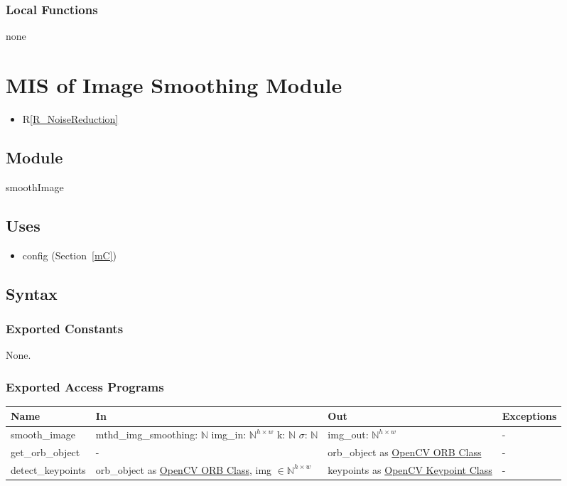 \documentclass[12pt, titlepage]{article}
\begin{document}
\subsubsection{Local Functions}
none


\section{MIS of Image Smoothing Module} \label{mIS}
\begin{itemize}
  \item R\ref{R_NoiseReduction}
\end{itemize}
\subsection{Module}
smoothImage

\subsection{Uses}
\begin{itemize}
  \item config (Section~\ref{mC})
\end{itemize}

\subsection{Syntax}
\subsubsection{Exported Constants}
None.
\subsubsection{Exported Access Programs}
\begin{center}
  \begin{tabular}{p{4cm} p{4.5cm} p{4cm} p{2cm}}
  \hline
  \textbf{Name} & \textbf{In} & \textbf{Out} & \textbf{Exceptions} \\
  \hline
  smooth\_image
  & mthd\_img\_smoothing: $\mathbb{N}$ \newline
  img\_in: $\mathbb{N}^{h \times w}$ \newline
  k: $\mathbb{N}$ \newline
  $\sigma$: $\mathbb{N}$
  & img\_out: $\mathbb{N}^{h \times w}$
  & - \\
  \hline
  get\_orb\_object 
  & -
  & orb\_object as \href{https://docs.opencv.org/3.4/db/d95/classcv_1_1ORB.html}{OpenCV ORB Class}
  & - \\
  \hline
  detect\_keypoints 
  & orb\_object as \href{https://docs.opencv.org/3.4/db/d95/classcv_1_1ORB.html}{OpenCV ORB Class}, \newline
  img $\in \mathbb{N}^{h \times w}$
  & keypoints as \href{https://docs.opencv.org/3.4/d2/d29/classcv_1_1KeyPoint.html}{OpenCV Keypoint Class}
  & - \\
  \hline
  \end{tabular}
  \end{center}
\end{document}
